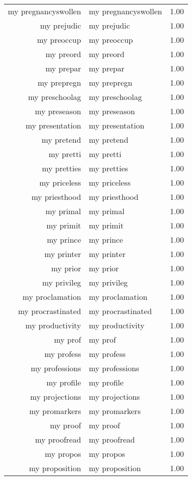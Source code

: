 \begin{table}[ht]
\begin{tabular}{rlr}
  my pregnancyswollen & my pregnancyswollen & 1.00 \\ 
  my prejudic & my prejudic & 1.00 \\ 
  my preoccup & my preoccup & 1.00 \\ 
  my preord & my preord & 1.00 \\ 
  my prepar & my prepar & 1.00 \\ 
  my prepregn & my prepregn & 1.00 \\ 
  my preschoolag & my preschoolag & 1.00 \\ 
  my preseason & my preseason & 1.00 \\ 
  my presentation & my presentation & 1.00 \\ 
  my pretend & my pretend & 1.00 \\ 
  my pretti & my pretti & 1.00 \\ 
  my pretties & my pretties & 1.00 \\ 
  my priceless & my priceless & 1.00 \\ 
  my priesthood & my priesthood & 1.00 \\ 
  my primal & my primal & 1.00 \\ 
  my primit & my primit & 1.00 \\ 
  my prince & my prince & 1.00 \\ 
  my printer & my printer & 1.00 \\ 
  my prior & my prior & 1.00 \\ 
  my privileg & my privileg & 1.00 \\ 
  my proclamation & my proclamation & 1.00 \\ 
  my procrastinated & my procrastinated & 1.00 \\ 
  my productivity & my productivity & 1.00 \\ 
  my prof & my prof & 1.00 \\ 
  my profess & my profess & 1.00 \\ 
  my professions & my professions & 1.00 \\ 
  my profile & my profile & 1.00 \\ 
  my projections & my projections & 1.00 \\ 
  my promarkers & my promarkers & 1.00 \\ 
  my proof & my proof & 1.00 \\ 
  my proofread & my proofread & 1.00 \\ 
  my propos & my propos & 1.00 \\ 
  my proposition & my proposition & 1.00 \\ 

\end{tabular}
\end{table}

